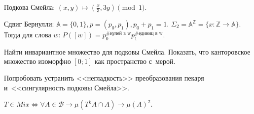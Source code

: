 \documentclass{article}
\begin{document}
\begin{definition}
	Подкова Смейла: $(x, y) \mapsto (\frac{x}{3}, 3y) \pmod 1$.
\end{definition}

\begin{definition}
	Сдвиг Бернулли: $\mathbb{A} = \{0, 1\}, p = (p_0, p_1), p_0 + p_1 = 1$.
	$\Sigma_2 = \mathbb{A}^\mathbb{Z} = \{ x : \mathbb{Z} \rightarrow \mathbb{A}
	\}$. Тогда для слова $w$: $P([w]) = p_0^{\text{\#нулей в~w}}
	p_1^{\text{\#единиц в~w}}$.
\end{definition}

\begin{exercise}
	Найти инвариантное множество для подковы Смейла.
	Показать, что канторовское множество изоморфно $[0; 1]$ как пространство
	с~мерой.
\end{exercise}

\begin{exercise}
	Попробовать устранить <<негладкость>> преобразования пекаря и~<<сингулярность
	подковы Смейла>>.
\end{exercise}

\begin{exercise}[$\star\star$]
	$T \in Mix \Leftrightarrow \forall A \in \mathcal{B} \rightarrow
	\mu(T^k A \cap A) \rightarrow \mu(A)^2$.
\end{exercise}
\end{document}
